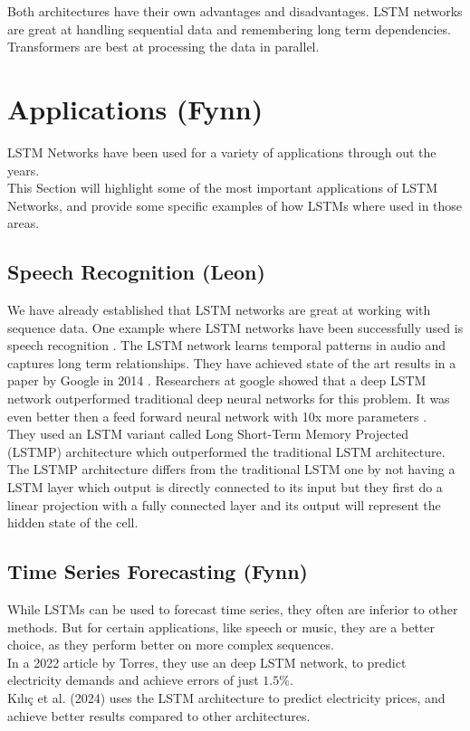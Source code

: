 \documentclass[twoside,a4paper,10pt,DIV=12,BCOR=12mm]{scrartcl}
\begin{document}
Both architectures have their own advantages and disadvantages. LSTM networks are great at handling sequential data and 
remembering long term dependencies. Transformers are best at processing the data in parallel.


\section{Applications (Fynn)}

LSTM Networks have been used for a variety of applications through out the years.\\
This Section will highlight some of the most important applications of LSTM Networks, and provide some specific examples of how LSTMs where used in those areas.

\subsection{Speech Recognition (Leon)}

We have already established that LSTM networks are great at working with sequence data. One example where LSTM networks
have been successfully used is speech recognition \cite{Graves04}. The LSTM network learns temporal patterns in audio and captures long 
term relationships. They have achieved state of the art results in a paper by Google in 2014 \cite{sak2014longshorttermmemorybased}.
Researchers at google showed that a deep LSTM network outperformed traditional deep neural networks for this problem.
It was even better then a feed forward neural network with 10x more parameters \cite{sak2014longshorttermmemorybased}.\\


They used an LSTM variant called Long Short-Term Memory Projected (LSTMP) architecture \cite{sak2014longshorttermmemorybased} which
outperformed the traditional LSTM architecture. The LSTMP architecture differs from the traditional LSTM one by not having a LSTM layer
which output is directly connected to its input but they first do a linear projection with a fully connected layer and its output will represent the 
hidden state of the cell.

\subsection{Time Series Forecasting (Fynn)}
While LSTMs can be used to forecast time series, they often are inferior to other methods.\cite{gers2001timeseries} But for certain applications, like speech or music, they are a better choice, as they perform better on more complex sequences.\cite{gers2001timeseries, cahuantzi2023lstmvsgru}\\
In a 2022 article by Torres, they use an deep LSTM network, to predict electricity demands and achieve errors of just \begin{math}1.5\%\end{math}.\cite{torres2022elctricityforecasting}\\
Kılıç et al. (2024) uses the LSTM architecture to predict electricity prices, and achieve better results compared to other architectures.\cite{nielsen2024electricitypriceforcasting}
\end{document}
